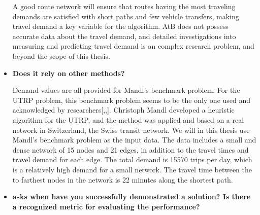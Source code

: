 \begin{itemize}
A good route network will ensure that routes having the most traveling demands are satisfied with short paths and few vehicle transfers, making travel demand a key variable for the algorithm. AtB\citep{website:atb} does not possess accurate data about the travel demand, and detailed investigations into measuring and predicting travel demand is an complex research problem, and beyond the scope of this thesis. 

\item \citet{cohen88} \textbf{Does it rely on other methods?}

Demand values are all provided for Mandl's benchmark problem. For the UTRP problem, this benchmark problem seems to be the only one used and acknowledged by researchers[\citep{fan09},\citep{kechagiopoulos14},\citep{nikolic14}]. Christoph Mandl\citep{mandl79} developed a heuristic algorithm for the UTRP, and the method was applied and based on a real network in Switzerland, the Swiss transit network\citep{mandl80}. We will in this thesis use Mandl's benchmark problem \citep{mandl79} as the input data. The data includes a small and dense network of 15 nodes and 21 edges, in addition to the travel times and travel demand for each edge. The total demand is 15570 trips per day, which is a relatively high demand for a small network. The travel time between the to farthest nodes in the network is 22 minutes along the shortest path. 


\item \citet{cohen88} \textbf{asks when have you successfully demonstrated a solution? Is there a recognized metric for evaluating the performance?}


\end{itemize}
